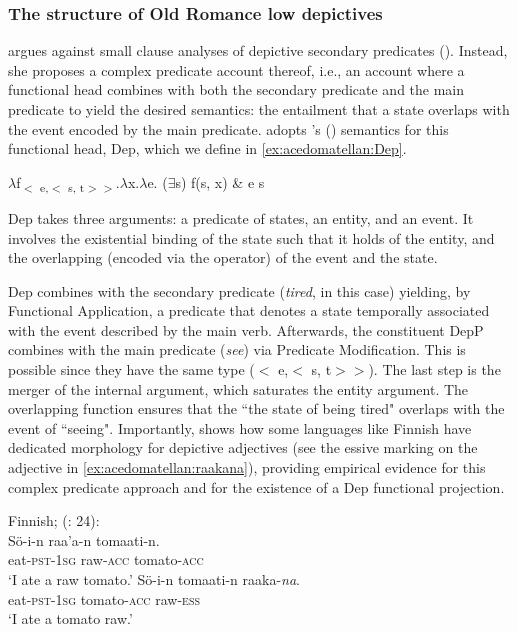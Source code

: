 \documentclass[output=paper,colorlinks,citecolor=brown,
]{langscibook}
\begin{document}
\subsubsection{The structure of Old Romance low depictives}\label{sec:acedomatellan:4-2-2}
\citet{Pylkkanen2008} argues against small clause analyses of depictive secondary predicates (\citealt{Williams1980}). Instead, she proposes a complex predicate account thereof, i.e., an account where a functional head combines with both the secondary predicate and the main predicate to yield the desired semantics: the entailment that a state overlaps with the event encoded by the main predicate. \citet{Pylkkanen2008} adopts \citeauthor{Geuder2000}'s (\citeyear{Geuder2000}) semantics for this functional head, Dep, which we define in \ref{ex:acedomatellan:Dep}. 


\ea\label{ex:acedomatellan:Dep}
  $\lambda$f\textsubscript{$<$ e,$<$ s, t$> >$}.$\lambda$x.$\lambda$e. ($\exists$s) f(s, x) \& e \textsubscript{\LARGE \textdegree} s 
\z

Dep takes three arguments: a predicate of states, an entity, and an event. It involves the existential binding of the state such that it holds of the entity, and the overlapping (encoded via the \textsubscript{\LARGE \textdegree} operator) of the event and the state. 

Dep combines with the secondary predicate (\textit{tired}, in this case) yielding, by Functional Application, a predicate that denotes a state temporally associated with the event described by the main verb. Afterwards, the constituent DepP combines with the main predicate (\textit{see}) via Predicate Modification. This is possible since they have the same type ($<$ e,$<$ s, t$> >$). The last step is the merger of the internal argument, which saturates the entity argument. The overlapping function ensures that the ``the state of being tired"  overlaps with the event of ``seeing". Importantly, \citeauthor{Pylkkanen2008} shows how some languages like Finnish have dedicated morphology for depictive adjectives (see the essive marking on the adjective in \ref{ex:acedomatellan:raakana}), providing empirical evidence for this complex predicate approach and for the existence of a Dep functional projection.

\ea Finnish; \citeauthor{Pylkkanen2008} (\citeyear{Pylkkanen2008}: 24):\\
  \ea
    \gll Sö-i-n 			raa’a-n 		tomaati-n.\\
eat-\textsc{pst}-\textsc{1sg} 	raw-\textsc{acc} 		tomato-\textsc{acc}\\
    \glt `I ate a raw tomato.’
  \ex \label{ex:acedomatellan:raakana}
    \gll Sö-i-n 			tomaati-n 			raaka-\textit{na}.\\
eat-\textsc{pst}-\textsc{1sg} tomato-\textsc{acc} raw-\textsc{ess}\\
    \glt `I ate a tomato raw.’
  \z 
\z 
\end{document}
